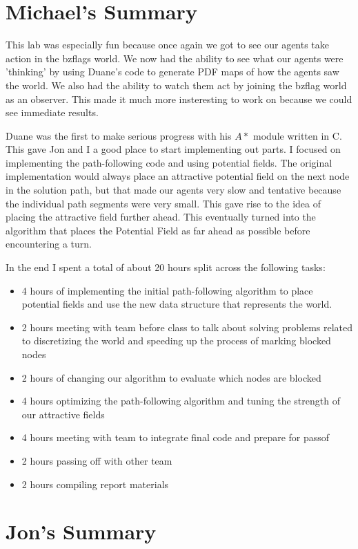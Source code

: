 \section{Michael's Summary}
This lab was especially fun because once again we got to see our agents take action in the bzflags world.  We now had the ability to see what our agents were 'thinking' by using Duane's code to generate PDF maps of how the agents saw the world.  We also had the ability to watch them act by joining the bzflag world as an observer.  This made it much more insteresting to work on because we could see immediate results.
\par
Duane was the first to make serious progress with his $A*$ module written in C.  This gave Jon and I a good place to start implementing out parts.  I focused on implementing the path-following code and using potential fields.  The original implementation would always place an attractive potential field on the next node in the solution path, but that made our agents very slow and tentative because the individual path segments were very small. This gave rise to the idea of placing the attractive field further ahead.  This eventually turned into the algorithm that places the Potential Field as far ahead as possible before encountering a turn.
\par
In the end I spent a total of about 20 hours split across the following tasks:
\begin{itemize}
    \item 4 hours of implementing the initial path-following algorithm to place potential fields and use the new data structure that represents the world.
    \item 2 hours meeting with team before class to talk about solving problems related to discretizing the world and speeding up the process of marking blocked nodes
    \item 2 hours of changing our algorithm to evaluate which nodes are blocked
    \item 4 hours optimizing the path-following algorithm and tuning the strength of our attractive fields
    \item 4 hours meeting with team to integrate final code and prepare for passof
    \item 2 hours passing off with other team
    \item 2 hours compiling report materials
\end{itemize}

\section{Jon's Summary}